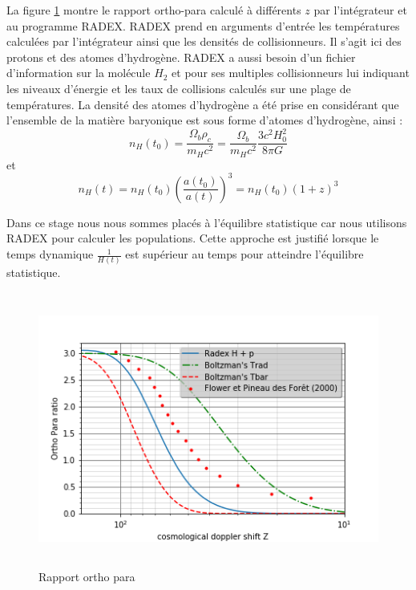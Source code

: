 \documentclass[10pt, a4paper]{report}
\numberwithin{equation}{subsection}
\begin{document}
La figure \ref{fig:ROP} montre le rapport ortho-para calculé à différents $z$ par l'intégrateur et au programme RADEX. RADEX prend en arguments d'entrée les températures calculées par l'intégrateur ainsi que les densités de collisionneurs. Il s'agit ici des protons et des atomes d'hydrogène. RADEX a aussi besoin d'un fichier d'information sur la molécule $H_2$ et pour ses multiples collisionneurs lui indiquant les niveaux d'énergie et les taux de collisions calculés sur une plage de températures. La densité des atomes d'hydrogène a été prise en considérant que l'ensemble de la matière baryonique est sous forme d'atomes d'hydrogène, ainsi :
\begin{equation} \label{eq:NHT0}
 \boxed{n_H(t_0) = \frac{\Omega_{b} \rho_c}{m_H c^2}= \frac{\Omega_{b}}{m_H c^2}\frac{3 c^2 H_0^2 }{8 \pi G} }  
\end{equation}
et
\begin{equation} \label{eq:NH}
\boxed{n_H(t) = n_H(t_0) \left(\frac{a(t_0)}{a(t)}\right)^3 = n_H(t_0) (1+z)^3} 
\end{equation}

 Dans ce stage nous nous sommes placés à l'équilibre statistique car nous utilisons RADEX pour calculer les populations. Cette approche est justifié lorsque le temps dynamique $\frac{1}{H(t)}$ est supérieur au temps pour atteindre l'équilibre statistique. 

\begin{figure}[]
\centering
\includegraphics[width=14.0cm,height=9cm]{rop.png}
\caption{Rapport ortho para}
\label{fig:ROP}
\end{figure}
\end{document}
